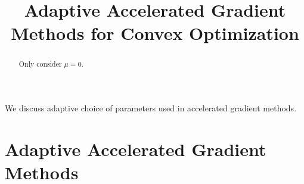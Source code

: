 \documentclass[10pt]{amsart}
\begin{document}
\title{Adaptive Accelerated Gradient Methods for Convex Optimization}
\begin{abstract}
Only consider $\mu = 0$. 
\end{abstract}
\maketitle

\tableofcontents


We discuss adaptive choice of parameters used in accelerated gradient methods. 

\section{Adaptive Accelerated Gradient Methods}
\end{document}
